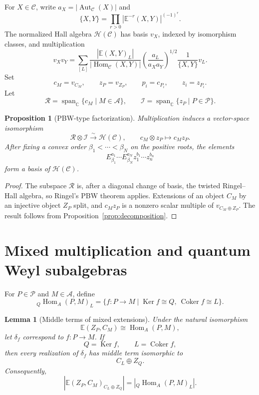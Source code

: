 \documentclass[12pt]{article}
\newcommand{\cA}{\mathcal A}
\newcommand{\cC}{\mathcal C}
\newcommand{\cI}{\mathcal I}
\newcommand{\cP}{\mathscr P}
\newcommand{\cR}{\mathcal R}
\newcommand{\HH}{\mathscr H}
\newcommand{\EE}{\mathbb E}
\newcommand{\Hom}{\operatorname{Hom}}
\newcommand{\Aut}{\operatorname{Aut}}
\newcommand{\Ker}{\operatorname{Ker}}
\newcommand{\Coker}{\operatorname{Coker}}
\theoremstyle{plain}
\newtheorem{proposition}[theorem]{Proposition}
\newtheorem{lemma}[theorem]{Lemma}
\theoremstyle{remark}
\begin{document}
For $X\in\cC$, write $a_X=|\Aut_{\cC}(X)|$ and
\[
 \{X,Y\}=\prod_{r>0}|\EE^{-r}(X,Y)|^{(-1)^r}.
\]
The normalized Hall algebra $\HH(\cC)$ has basis $v_X$, indexed by
isomorphism classes, and multiplication
\[
 v_Xv_Y=\sum_{[L]}
 \frac{|\EE(X,Y)_L|}{|\Hom_{\cC}(X,Y)|}
 \left(\frac{a_L}{a_Xa_Y}\right)^{1/2}
 \frac{1}{\{X,Y\}}v_L.
\]
Set
\[
 c_M=v_{C_M},\qquad z_P=v_{Z_P},\qquad
 p_i=c_{P_i},\qquad z_i=z_{P_i}.
\]
Let
\[
 \cR=\operatorname{span}_{\mathbb C}\{c_M\mid M\in\cA\},\qquad
 \cI=\operatorname{span}_{\mathbb C}\{z_P\mid P\in\cP\}.
\]

\begin{proposition}[PBW-type factorization]\label{prop:factorization}
Multiplication induces a vector-space isomorphism
\[
 \cR\otimes\cI\xrightarrow{\sim}\HH(\cC),
 \qquad c_M\otimes z_P\longmapsto c_Mz_P.
\]
After fixing a convex order $\beta_1<\cdots<\beta_N$ on the positive roots,
the elements
\[
 E_{\beta_1}^{a_1}\cdots E_{\beta_N}^{a_N}
 z_1^{b_1}\cdots z_n^{b_n}
\]
form a basis of $\HH(\cC)$.
\end{proposition}

\begin{proof}
The subspace $\cR$ is, after a diagonal change of basis, the twisted
Ringel--Hall algebra, so Ringel's PBW theorem applies. Extensions of an
object $C_M$ by an injective object $Z_P$ split, and $c_Mz_P$ is a nonzero
scalar multiple of $v_{C_M\oplus Z_P}$. The result follows from
Proposition~\ref{prop:decomposition}.
\end{proof}

\section{Mixed multiplication and quantum Weyl subalgebras}

For $P\in\cP$ and $M\in\cA$, define
\[
 {}_Q\Hom_A(P,M)_L=
 \{f:P\to M\mid\Ker f\cong Q,\ \Coker f\cong L\}.
\]

\begin{lemma}[Middle terms of mixed extensions]\label{lem:middle-term}
Under the natural isomorphism
\[
 \EE(Z_P,C_M)\cong\Hom_A(P,M),
\]
let $\delta_f$ correspond to $f:P\to M$. If
\[
 Q=\Ker f,\qquad L=\Coker f,
\]
then every realization of $\delta_f$ has middle term isomorphic to
\[
 C_L\oplus Z_Q.
\]
Consequently,
\[
 |\EE(Z_P,C_M)_{C_L\oplus Z_Q}|
 =|{}_Q\Hom_A(P,M)_L|.
\]
\end{lemma}
\end{document}

